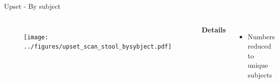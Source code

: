 \begin{frame}{Upset - By subject}
    \begin{columns}[c] %

    
        \begin{figure}
        \texttt{[image: ../figures/upset\_scan\_stool\_bysybject.pdf]}
        \end{figure}

    
        \textbf{Details}
        \begin{itemize}
            \item Numbers reduced to unique subjects
        \end{itemize}

    \end{columns}

\end{frame}

